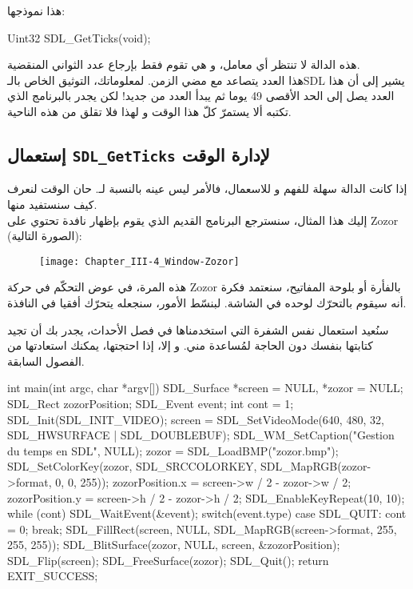 هذا نموذجها:

\begin{Csource}
Uint32 SDL_GetTicks(void);
\end{Csource}

هذه الدالة لا تنتظر أي معامل، و هي تقوم فقط بإرجاع عدد الثواني المنقضية. \\
هذا العدد يتصاعد مع مضي الزمن. لمعلوماتك، التوثيق الخاص بالـ\textenglish{SDL}
يشير إلى أن هذا العدد يصل إلى الحد الأقصى 49 يوما ثم يبدأ العدد من جديد! لكن يجدر بالبرنامج الذي تكتبه ألا يستمرّ كلّ هذا الوقت و لهذا فلا تقلق من هذه الناحية.

\subsection{إستعمال \texttt{SDL\_GetTicks} لإدارة الوقت}

إذا كانت الدالة
سهلة للفهم و للاسعمال، فالأمر ليس عينه بالنسبة لـ.
حان الوقت لنعرف كيف سنستفيد منها.\\
إليك هذا المثال، سنسترجع البرنامج القديم الذي يقوم بإظهار نافدة تحتوي على
\textenglish{Zozor}
(الصورة التالية):

\begin{figure}[H]
	\centering
	\texttt{[image: Chapter\_III-4\_Window-Zozor]}
\end{figure}

هذه المرة، في عوض التحكّم في حركة
\textenglish{Zozor}
بالفأرة أو بلوحة المفاتيح، سنعتمد فكرة أنه سيقوم بالتحرّك لوحده في الشاشة. لبنسّط الأمور، سنجعله يتحرّك أفقيا في النافذة. 

سنُعيد استعمال نفس الشفرة التي استخدمناها في فصل الأحداث، يجدر بك أن تجيد كتابتها بنفسك دون الحاجة لمُساعدة مني. و إلا،  إذا احتجتها، يمكنك استعادتها من الفصول السابقة.

\begin{Csource}
int main(int argc, char *argv[])
{
	SDL_Surface *screen = NULL, *zozor = NULL;
	SDL_Rect zozorPosition;
	SDL_Event event;
	int cont = 1;
	SDL_Init(SDL_INIT_VIDEO);
	screen = SDL_SetVideoMode(640, 480, 32, SDL_HWSURFACE | SDL_DOUBLEBUF);
	SDL_WM_SetCaption("Gestion du temps en SDL", NULL);
	zozor = SDL_LoadBMP("zozor.bmp");
	SDL_SetColorKey(zozor, SDL_SRCCOLORKEY, SDL_MapRGB(zozor->format, 0, 0, 255));
	zozorPosition.x = screen->w / 2 - zozor->w / 2;
	zozorPosition.y = screen->h / 2 - zozor->h / 2;
	SDL_EnableKeyRepeat(10, 10);
	while (cont)
	{
		SDL_WaitEvent(&event);
		switch(event.type)
		{
			case SDL_QUIT:
			cont = 0;
			break;
		}
		SDL_FillRect(screen, NULL, SDL_MapRGB(screen->format, 255, 255, 255));
		SDL_BlitSurface(zozor, NULL, screen, &zozorPosition);
		SDL_Flip(screen);
	}
	SDL_FreeSurface(zozor);
	SDL_Quit();
	return EXIT_SUCCESS;
}
\end{Csource}

